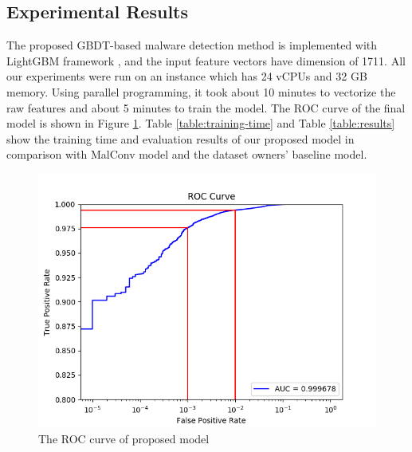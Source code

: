 \documentclass[runningheads]{llncs}
\begin{document}
\subsection{Experimental Results}

The proposed GBDT-based malware detection method is implemented with LightGBM framework \cite{ke2017lightgbm}, and the input feature vectors have dimension of 1711. All our experiments were run on an instance which has 24 vCPUs and 32 GB memory. Using parallel programming, it took about 10 minutes to vectorize the raw features and about 5 minutes to train the model. The ROC curve of the final model is shown in Figure \ref{fig:roc_curve_with_highlights}. Table \ref{table:training-time} and Table \ref{table:results} show the training time and evaluation results of our proposed model in comparison with MalConv model and the dataset owners’ baseline model.

\begin{figure}[h]
\centering
\includegraphics[width=\textwidth]{roc_curve_with_highlights.png}
\caption{The ROC curve of proposed model}
\label{fig:roc_curve_with_highlights}
\end{figure}
\end{document}
